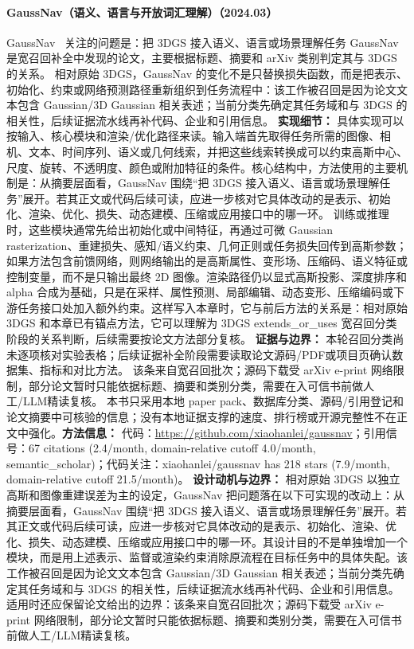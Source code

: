 \paragraph{GaussNav（语义、语言与开放词汇理解）（2024.03）}
GaussNav~\cite{2403_11625} 关注的问题是：把 3DGS 接入语义、语言或场景理解任务 GaussNav 是宽召回补全中发现的论文，主要根据标题、摘要和 arXiv 类别判定其与 3DGS 的关系。
相对原始 3DGS，GaussNav 的变化不是只替换损失函数，而是把表示、初始化、约束或网络预测路径重新组织到任务流程中：该工作被召回是因为论文文本包含 Gaussian/3D Gaussian 相关表述；当前分类先确定其任务域和与 3DGS 的相关性，后续证据流水线再补代码、企业和引用信息。
\textbf{实现细节：} 具体实现可以按输入、核心模块和渲染/优化路径来读。输入端首先取得任务所需的图像、相机、文本、时间序列、语义或几何线索，并把这些线索转换成可以约束高斯中心、尺度、旋转、不透明度、颜色或附加特征的条件。核心结构中，方法使用的主要机制是：从摘要层面看，GaussNav 围绕“把 3DGS 接入语义、语言或场景理解任务”展开。若其正文或代码后续可读，应进一步核对它具体改动的是表示、初始化、渲染、优化、损失、动态建模、压缩或应用接口中的哪一环。 训练或推理时，这些模块通常先给出初始化或中间特征，再通过可微 Gaussian rasterization、重建损失、感知/语义约束、几何正则或任务损失回传到高斯参数；如果方法包含前馈网络，则网络输出的是高斯属性、变形场、压缩码、语义特征或控制变量，而不是只输出最终 2D 图像。渲染路径仍以显式高斯投影、深度排序和 alpha 合成为基础，只是在采样、属性预测、局部编辑、动态变形、压缩编码或下游任务接口处加入额外约束。这样写入本章时，它与前后方法的关系是：相对原始 3DGS 和本章已有锚点方法，它可以理解为 3DGS extends\_or\_uses 宽召回分类阶段的关系判断，后续需要按论文方法部分复核。
\textbf{证据与边界：} 本轮召回分类尚未逐项核对实验表格；后续证据补全阶段需要读取论文源码/PDF或项目页确认数据集、指标和对比方法。 该条来自宽召回批次；源码下载受 arXiv e-print 网络限制，部分论文暂时只能依据标题、摘要和类别分类，需要在入可信书前做人工/LLM精读复核。 本书只采用本地 paper pack、数据库分类、源码/引用登记和论文摘要中可核验的信息；没有本地证据支撑的速度、排行榜或开源完整性不在正文中强化。\textbf{方法信息：} 代码：\url{https://github.com/xiaohanlei/gaussnav}；引用信号：67 citations (2.4/month, domain-relative cutoff 4.0/month, semantic\_scholar)；代码关注：xiaohanlei/gaussnav has 218 stars (7.9/month, domain-relative cutoff 21.5/month)。
\textbf{设计动机与边界：} 相对原始 3DGS 以独立高斯和图像重建误差为主的设定，GaussNav 把问题落在以下可实现的改动上：从摘要层面看，GaussNav 围绕“把 3DGS 接入语义、语言或场景理解任务”展开。若其正文或代码后续可读，应进一步核对它具体改动的是表示、初始化、渲染、优化、损失、动态建模、压缩或应用接口中的哪一环。其设计目的不是单独增加一个模块，而是用上述表示、监督或渲染约束消除原流程在目标任务中的具体失配。该工作被召回是因为论文文本包含 Gaussian/3D Gaussian 相关表述；当前分类先确定其任务域和与 3DGS 的相关性，后续证据流水线再补代码、企业和引用信息。适用时还应保留论文给出的边界：该条来自宽召回批次；源码下载受 arXiv e-print 网络限制，部分论文暂时只能依据标题、摘要和类别分类，需要在入可信书前做人工/LLM精读复核。
